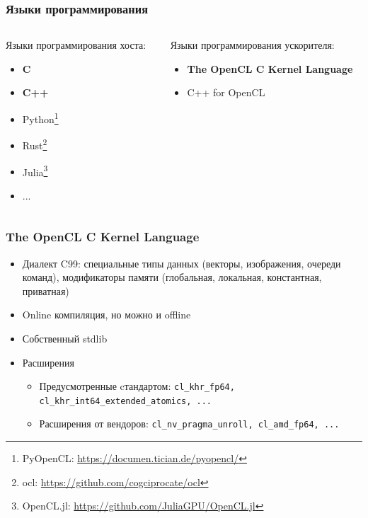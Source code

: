 \documentclass[
    aspectratio=169,
]{beamer}
\begin{document}
\begin{frame}
    \frametitle{Языки программирования}

    \begin{columns}[t]
        \begin{column}{0.5\textwidth}
            Языки программирования хоста:
            \begin{itemize}
                \item \textbf{C}
                \item \textbf{C++}
                \item Python\footnote[frame]{PyOpenCL: \url{https://documen.tician.de/pyopencl/}}
                \item Rust\footnote[frame]{ocl: \url{https://github.com/cogciprocate/ocl}}
                \item Julia\footnote[frame]{OpenCL.jl: \url{https://github.com/JuliaGPU/OpenCL.jl}}
                \item ...
            \end{itemize}
        \end{column}
        \begin{column}{0.5\textwidth}
            Языки программирования ускорителя:
            \begin{itemize}
                \item \textbf{The OpenCL C Kernel Language}
                \item C++ for OpenCL
            \end{itemize}
        \end{column}
    \end{columns}

\end{frame}

\begin{frame}
    \frametitle{The OpenCL C Kernel Language}

    \begin{itemize}
        \item Диалект C99: специальные типы данных (векторы, изображения, очереди команд), модификаторы памяти (глобальная, локальная, константная, приватная)
        \item Online компиляция, но можно и offline
        \item Собственный stdlib
        \item Расширения
              \begin{itemize}
                  \item Предусмотренные cтандартом: \texttt{cl\_khr\_fp64, cl\_khr\_int64\_extended\_atomics, ...}
                  \item Расширения от вендоров: \texttt{cl\_nv\_pragma\_unroll, cl\_amd\_fp64, ...}
              \end{itemize}
    \end{itemize}

\end{frame}
\end{document}

